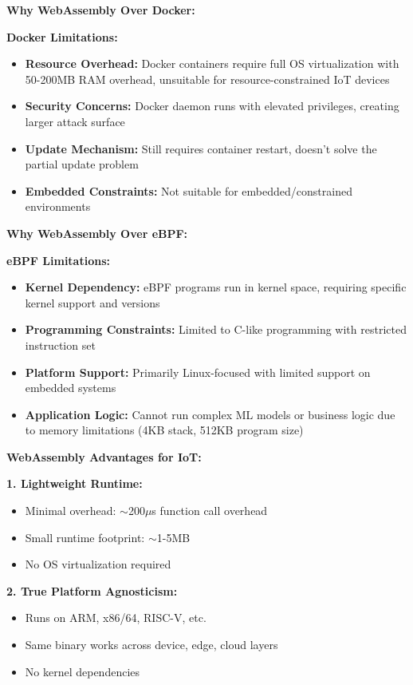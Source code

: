 \documentclass[11pt]{article}
\begin{document}
\textbf{Why WebAssembly Over Docker:}

\textbf{Docker Limitations:}
\begin{itemize}
\item \textbf{Resource Overhead:} Docker containers require full OS virtualization with 50-200MB RAM overhead, unsuitable for resource-constrained IoT devices
\item \textbf{Security Concerns:} Docker daemon runs with elevated privileges, creating larger attack surface
\item \textbf{Update Mechanism:} Still requires container restart, doesn't solve the partial update problem
\item \textbf{Embedded Constraints:} Not suitable for embedded/constrained environments
\end{itemize}

\textbf{Why WebAssembly Over eBPF:}

\textbf{eBPF Limitations:}
\begin{itemize}
\item \textbf{Kernel Dependency:} eBPF programs run in kernel space, requiring specific kernel support and versions
\item \textbf{Programming Constraints:} Limited to C-like programming with restricted instruction set
\item \textbf{Platform Support:} Primarily Linux-focused with limited support on embedded systems
\item \textbf{Application Logic:} Cannot run complex ML models or business logic due to memory limitations (4KB stack, 512KB program size)
\end{itemize}

\textbf{WebAssembly Advantages for IoT:}

\textbf{1. Lightweight Runtime:}
\begin{itemize}
\item Minimal overhead: $\sim$200$\mu$s function call overhead
\item Small runtime footprint: $\sim$1-5MB
\item No OS virtualization required
\end{itemize}

\textbf{2. True Platform Agnosticism:}
\begin{itemize}
\item Runs on ARM, x86/64, RISC-V, etc.
\item Same binary works across device, edge, cloud layers
\item No kernel dependencies
\end{itemize}
\end{document}
